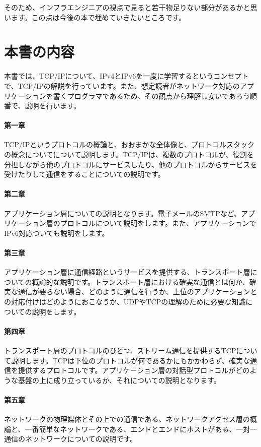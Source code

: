 そのため、インフラエンジニアの視点で見ると若干物足りない部分があるかと思います。この点は今後の本で埋めていきたいところです。


\section*{本書の内容}
本書では、TCP/IPについて、IPv4とIPv6を一度に学習するというコンセプトで、TCP/IPの解説を行っています。また、想定読者がネットワーク対応のアプリケーションを書くプログラマであるため、その観点から理解し安いであろう順番で、説明を行います。

\paragraph{第一章}
TCP/IPというプロトコルの概論と、おおまかな全体像と、プロトコルスタックの概念についてについて説明します。TCP/IPは、複数のプロトコルが、役割を分担しながら他のプロトコルにサービスしたり、他のプロトコルからサービスを受けたりして通信をすることについての説明です。

\paragraph{第二章}
アプリケーション層についての説明となります。電子メールのSMTPなど、アプリケーション層のプロトコルについて説明をします。また、アプリケーションでIPv6対応ついても説明をします。

\paragraph{第三章}
アプリケーション層に通信経路というサービスを提供する、トランスポート層についての概論的な説明です。トランスポート層における確実な通信とは何か、確実な通信が要らない場合、どのように通信を行うか、上位のアプリケーションとの対応付けはどのようにおこなうか、UDPやTCPの理解のために必要な知識についての説明をします。

\paragraph{第四章}
トランスポート層のプロトコルのひとつ、ストリーム通信を提供するTCPについて説明します。TCPは下位のプロトコルが何であるかにもかかわらず、確実な通信を提供するプロトコルです。アプリケーション層の対話型プロトコルがどのような基盤の上に成り立っているか、それについての説明となります。

\paragraph{第五章}
ネットワークの物理媒体とその上での通信である、ネットワークアクセス層の概論と、一番簡単なネットワークである、エンドとエンドにホストがある、一対一通信のネットワークについての説明です。

